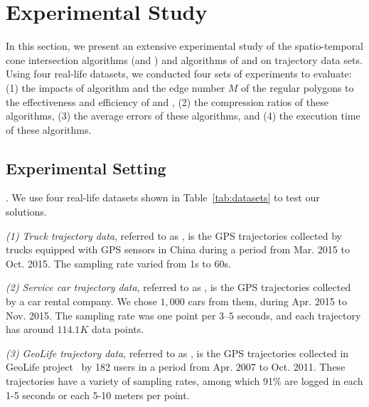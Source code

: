\section{Experimental Study} %
\label{sec-exp}
In this section, we present an extensive experimental study of the spatio-temporal cone intersection algorithms (\cist and \cista) and algorithms of \dpa and \squishe on trajectory data sets.
Using four real-life datasets, we conducted four sets of experiments to evaluate:
(1) the impacts of algorithm \rpia and the edge number $M$ of the regular polygons to the effectiveness and efficiency of \cist and \cista,
(2) the compression ratios of these algorithms,
(3) the average errors of these algorithms, and
(4) the execution time of these algorithms.



\subsection{Experimental Setting}

.
We use four real-life datasets shown in Table~\ref{tab:datasets} to test our solutions.

\eat{
}

\ni \emph{(1) Truck trajectory data}, referred to as \truck, is the GPS trajectories collected by  trucks equipped with GPS sensors in China
during a period from Mar. 2015 to Oct. 2015. The sampling rate varied from 1s to 60s.

\ni \emph{(2) Service car trajectory data}, referred to as \sercar,  is the GPS trajectories collected by a car rental company.
We chose $1,000$ cars from them, during Apr. 2015 to Nov. 2015. The sampling rate was one point per $3$--$5$ seconds, and
each trajectory has around $114.1K$ data points.

\ni \emph{(3) GeoLife trajectory data}, referred to as \geolife, is the GPS trajectories collected in GeoLife project~\cite{Zheng:GeoLife} by 182 users in a period from Apr. 2007 to Oct. 2011. These trajectories have a variety of sampling rates, among which 91\% are logged in each 1-5 seconds or each 5-10 meters per point.

